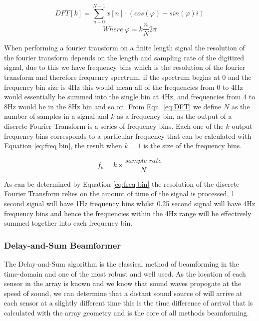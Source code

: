 \documentclass{UoNMCHA}
\numberwithin{equation}{section}
\begin{document}
    \begin{equation}
        DFT[k]=\sum_{n-0}^{N-1}x[n] \cdot (cos(\varphi) - sin(\varphi)i)
        \label{eq:DFT}
    \end{equation}
        \begin{equation*}
        Where \; \varphi = k \frac{n}{N}2 \pi
    \end{equation*}
    
    When performing a fourier transform on a finite length signal the resolution of the fourier transform depends on the length and sampling rate of the digitized signal, due to this we have frequency bins which is the resolution of the fourier transform and therefore frequency spectrum, if the spectrum begins at 0 and the frequency bin size is 4Hz this would mean all of the frequencies from 0 to 4Hz would essentially be summed into the single bin at 4Hz, and frequencies from 4 to 8Hz would be in the 8Hz bin and so on. From Eqn. \ref{eq:DFT} we define $N$ as the number of samples in a signal and $k$ as a frequency bin, as the output of a discrete Fourier Transform is a series of frequency bins. Each one of the $k$ output frequency bins corresponds to a particular frequency that can be calculated with Equation \ref{eq:freq bin}, the result when $k=1$ is the size of the frequency bins.
    
    \begin{equation}
        f_k = k \times \frac{sample\;rate}{N}
        \label{eq:freq bin}
    \end{equation}
    
    As can be determined by Equation \ref{eq:freq bin} the resolution of the discrete Fourier Transform relies on the amount of time of the signal is processed, 1 second signal will have 1Hz frequency bins whilst 0.25 second signal will have 4Hz frequency bins and hence the frequencies within the 4Hz range will be effectively summed together into each frequency bin.
    
\subsubsection{Delay-and-Sum Beamformer} \label{sec:DAS Algorithm}
    The Delay-and-Sum algorithm is the classical method of beamforming in the time-domain and one of the most robust and well used. As the location of each sensor in the array is known and we know that sound waves propogate at the speed of sound, we can determine that a distant sound source of will arrive at each sensor at a slightly different time this is the time difference of arrival that is calculated with the array geometry and is the core of all methods beamforming.
    
\end{document}
